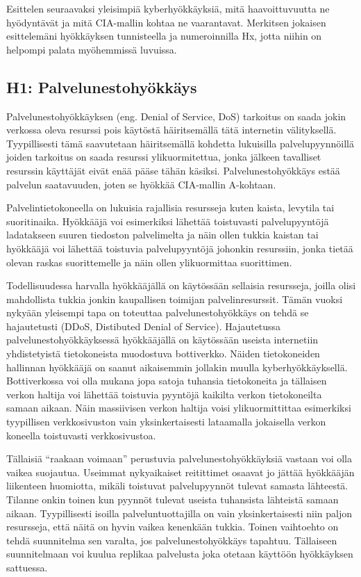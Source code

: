 Esittelen seuraavaksi yleisimpiä kyberhyökkäyksiä, mitä haavoittuvuutta ne hyödyntävät ja mitä CIA-mallin kohtaa ne vaarantavat. Merkitsen jokaisen esittelemäni hyökkäyksen tunnisteella ja numeroinnilla Hx, jotta niihin on helpompi palata myöhemmissä luvuissa.

\subsection{H1: Palvelunestohyökkäys}
Palvelunestohyökkäyksen (eng. Denial of Service, DoS) tarkoitus on saada jokin verkossa oleva resurssi pois käytöstä häiritsemällä tätä internetin välityksellä. Tyypillisesti tämä saavutetaan häiritsemällä kohdetta lukuisilla palvelupyynnöillä joiden tarkoitus on saada resurssi ylikuormitettua, jonka jälkeen tavalliset resurssin käyttäjät eivät enää pääse tähän käsiksi. Palvelunestohyökkäys estää palvelun saatavuuden, joten se hyökkää CIA-mallin A-kohtaan.~\cite{nist_ddos}

Palvelintietokoneella on lukuisia rajallisia resursseja kuten kaista, levytila tai suoritinaika. Hyökkääjä voi esimerkiksi lähettää toistuvasti palvelupyyntöjä ladatakseen suuren tiedoston palvelimelta ja näin ollen tukkia kaistan tai hyökkääjä voi lähettää toistuvia palvelupyyntöjä johonkin resurssiin, jonka tietää olevan raskas suorittemelle ja näin ollen ylikuormittaa suorittimen.

Todellisuudessa harvalla hyökkääjällä on käytössään sellaisia resursseja, joilla olisi mahdollista tukkia jonkin kaupallisen toimijan palvelinresurssit. Tämän vuoksi nykyään yleisempi tapa on toteuttaa palvelunestohyökkäys on tehdä se hajautetusti (DDoS, Distibuted Denial of Service). Hajautetussa palvelunestohyökkäyksessä hyökkääjällä on käytössään useista internetiin yhdistetyistä tietokoneista muodostuva bottiverkko. Näiden tietokoneiden hallinnan hyökkääjä on saanut aikaisemmin jollakin muulla kyberhyökkäyksellä. Bottiverkossa voi olla mukana jopa satoja tuhansia tietokoneita ja tällaisen verkon haltija voi lähettää toistuvia pyyntöjä kaikilta verkon tietokoneilta samaan aikaan. Näin massiivisen verkon haltija voisi ylikuormittittaa esimerkiksi tyypillisen verkkosivuston vain yksinkertaisesti lataamalla jokaisella verkon koneella toistuvasti verkkosivustoa.~\cite{informationsecurity}

Tällaisiä ``raakaan voimaan'' perustuvia palvelunestohyökkäyksiä vastaan voi olla vaikea suojautua. Useimmat nykyaikaiset reitittimet osaavat jo jättää hyökkääjän liikenteen huomiotta, mikäli toistuvat palvelupyynnöt tulevat samasta lähteestä. Tilanne onkin toinen kun pyynnöt tulevat useista tuhansista lähteistä samaan aikaan. Tyypillisesti isoilla palveluntuottajilla on vain yksinkertaisesti niin paljon resursseja, että näitä on hyvin vaikea kenenkään tukkia. Toinen vaihtoehto on tehdä suunnitelma sen varalta, jos palvelunestohyökkäys tapahtuu. Tällaiseen suunnitelmaan voi kuulua replikaa palvelusta joka otetaan käyttöön hyökkäyksen sattuessa.

